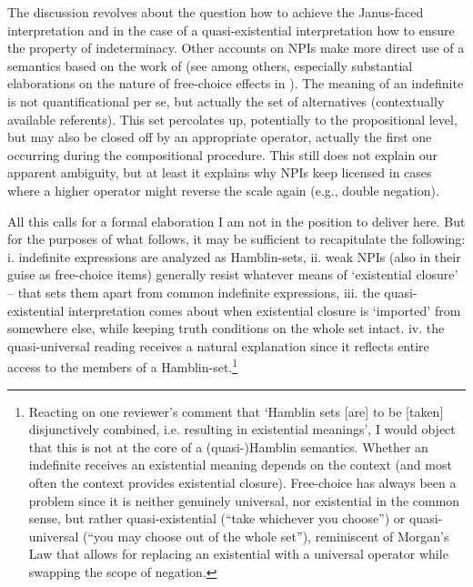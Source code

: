 \documentclass[output=paper,colorlinks,citecolor=brown,
]{langscibook}
\begin{document}
The discussion revolves about the question how to achieve the Janus-faced interpretation and in the case of a
quasi-existential interpretation how to ensure the property of indeterminacy. Other accounts on NPIs make more direct use
of a semantics based on the work of \citet{hamblin1973}
(see \citet{ramchand1997,kratzershimo2002,kratzer2005,novelromero2009} among others, especially substantial elaborations
on the nature of free-choice effects in \citet{fox2007,chierchia2013}). The meaning of an indefinite is
not quantificational per se, but actually the set of alternatives (contextually available referents). This set percolates up,
potentially to the propositional level, but may also be closed off by an appropriate operator, actually the first one
occurring during the compositional procedure. This still does not explain our apparent ambiguity, but at least it
explains why NPIs keep licensed in cases where a higher operator might reverse the scale again (e.g., double negation).

All this calls for a formal elaboration I am not in the position to deliver here. But for the purposes of what
follows, it may be sufficient to recapitulate the following: i. indefinite expressions are analyzed as Hamblin-sets,
ii. weak NPIs (also in their guise as free-choice items) generally resist whatever means of `existential closure' -- that sets them apart from common indefinite
expressions, iii. the quasi-existential interpretation comes about when existential closure is `imported' from
somewhere else, while keeping truth conditions on the whole set intact. iv. the quasi-universal reading receives a
natural explanation since it reflects entire access to the members of a Hamblin-set.\footnote{Reacting on one
reviewer's comment that `Hamblin sets [are] to be [taken] disjunctively combined, i.e. resulting in existential
meanings', I would object that this is not at the core of a (quasi-)Hamblin semantics. Whether an indefinite receives
an existential meaning depends on the context (and most often the context provides existential closure). Free-choice
has always been a problem since it is neither genuinely universal, nor existential in the common sense, but rather
quasi-existential (``take whichever you choose'') or quasi-universal (``you may choose out of the whole set''),
reminiscent of Morgan's Law that allows for replacing an existential with a universal operator while swapping the scope
of negation.}
\end{document}
